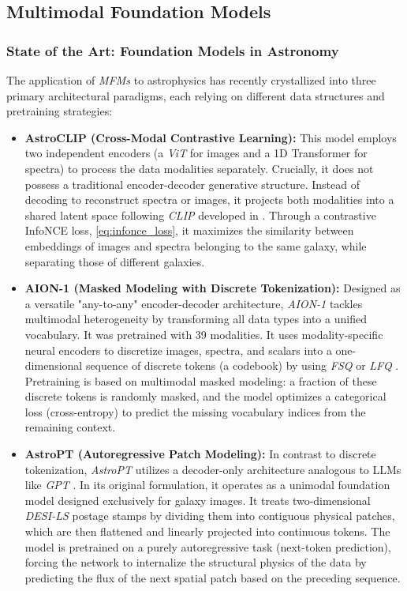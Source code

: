 \subsection{Multimodal Foundation Models} \label{sec:tb:MFM}

\subsubsection{State of the Art: Foundation Models in Astronomy}

The application of \textit{\glspl{MFM}} to astrophysics has recently crystallized into three primary architectural paradigms, each relying on different data structures and pretraining strategies:

\begin{itemize}
    \item \textbf{AstroCLIP \autocite{ar:astroclip} (Cross-Modal Contrastive Learning):} This model employs two independent encoders (a \textit{\gls{ViT}} for images and a 1D Transformer for spectra) to process the data modalities separately. Crucially, it does not possess a traditional encoder-decoder generative structure. Instead of decoding to reconstruct spectra or images, it projects both modalities into a shared latent space following \textit{\gls{CLIP}} developed in \textcite{ar:clip}. Through a contrastive InfoNCE loss, \cref{eq:infonce_loss}, it maximizes the similarity between embeddings of images and spectra belonging to the same galaxy, while separating those of different galaxies.
    
    \item \textbf{AION-1 \autocite{ar:aion-1} (Masked Modeling with Discrete Tokenization):} Designed as a versatile "any-to-any" encoder-decoder architecture, \textit{AION-1} tackles multimodal heterogeneity by transforming all data types into a unified vocabulary. It was pretrained with 39 modalities. It uses modality-specific neural encoders to discretize images, spectra, and scalars into a one-dimensional sequence of discrete tokens (a codebook) by using \textit{\gls{FSQ}} \autocite{ar:mentzer-2023} or \textit{\gls{LFQ}} \autocite{ar:yu-2023}. Pretraining is based on multimodal masked modeling: a fraction of these discrete tokens is randomly masked, and the model optimizes a categorical loss (cross-entropy) to predict the missing vocabulary indices from the remaining context.
    
    \item \textbf{AstroPT \autocite{ar:astropt} (Autoregressive Patch Modeling):} In contrast to discrete tokenization, \textit{AstroPT} utilizes a decoder-only architecture analogous to \glspl{LLM} like \textit{\gls{GPT}} \autocite{ar:radford-2021}. In its original formulation, it operates as a unimodal foundation model designed exclusively for galaxy images. It treats two-dimensional \textit{DESI-LS} postage stamps by dividing them into contiguous physical patches, which are then flattened and linearly projected into continuous tokens. The model is pretrained on a purely autoregressive task (next-token prediction), forcing the network to internalize the structural physics of the data by predicting the flux of the next spatial patch based on the preceding sequence.
    

\end{itemize}
